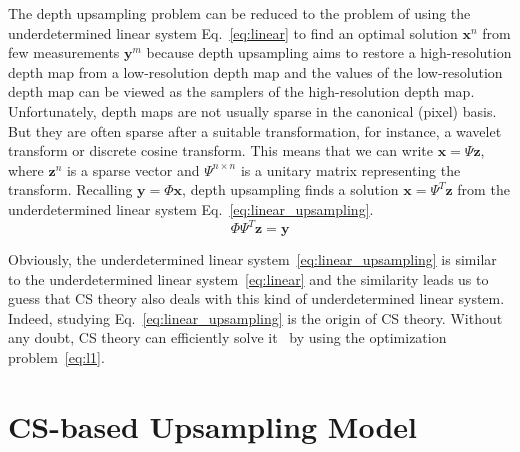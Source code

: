\documentclass[preprint,10pt,5p,times,twocolumn]{elsarticle}
\begin{document}
The depth upsampling problem can be reduced to the problem of using the underdetermined linear system Eq.~\eqref{eq:linear} to find an optimal solution $\mathbf{x}^n$ from few measurements $\mathbf{y}^m$ because depth upsampling aims to restore a high-resolution depth map from a low-resolution depth map and the values of the low-resolution depth map can be viewed as the samplers of the high-resolution depth map. Unfortunately, depth maps are not usually sparse in the canonical (pixel) basis. But they are often sparse after a suitable transformation, for instance, a wavelet transform or discrete cosine transform. This means that we can write $\mathbf{x} = \Psi \mathbf{z}$, where $\mathbf{z}^n$ is a sparse vector and $\Psi^{n \times n}$ is a unitary matrix representing the transform. Recalling $\mathbf{y} = \Phi \mathbf{x}$, depth upsampling finds a solution $\mathbf{x} = \Psi^T \mathbf{z}$ from the underdetermined linear system Eq.~\eqref{eq:linear_upsampling}.
%
\begin{equation}
\Phi \Psi^T \mathbf{z} = \mathbf{y}
\label{eq:linear_upsampling}
\end{equation}
%

Obviously, the underdetermined linear system~\eqref{eq:linear_upsampling} is similar to the underdetermined linear system~\eqref{eq:linear} and the similarity leads us to guess that CS theory also deals with this kind of underdetermined linear system. Indeed, studying Eq.~\eqref{eq:linear_upsampling} is the origin of CS theory. Without any doubt, CS theory can efficiently solve it~\cite{CRT06,Donoho06,CW08} by using the optimization problem~\eqref{eq:l1}.

\section{CS-based Upsampling Model}
\label{chap:csmodel}
\end{document}
